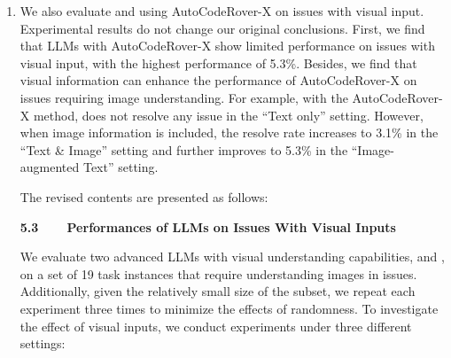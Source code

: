 \documentclass[12pt,american]{article}
\begin{document}
\begin{revresponse}
\begin{enumerate}
\begin{table}[h]
\end{table}

\item We also evaluate \GPT and \Claude using AutoCodeRover-X on issues with visual input. Experimental results do not change our original conclusions. First, we find that LLMs with AutoCodeRover-X show limited performance on issues with visual input, with the highest performance of 5.3\%. Besides, we find that visual information can enhance the performance of AutoCodeRover-X on issues requiring image understanding. For example, with the AutoCodeRover-X method, \GPT does not resolve any issue in the ``Text only'' setting. However, when image information is included, the resolve rate increases to 3.1\% in the ``Text \& Image'' setting and further improves to 5.3\% in the ``Image-augmented Text'' setting.

The revised contents are presented as follows:
\begin{changes}


\textbf{5.3~~~~Performances of LLMs on Issues With Visual Inputs}

We evaluate two advanced LLMs with visual understanding capabilities, \GPT and \Claude, on a set of 19 task instances that require understanding images in issues. 
 Additionally, given the relatively small size of the subset, we repeat each experiment three times to minimize the effects of randomness. To investigate the effect of visual inputs, we conduct experiments under three different settings: 


\end{changes}
\end{enumerate}
\end{revresponse}
\end{document}
